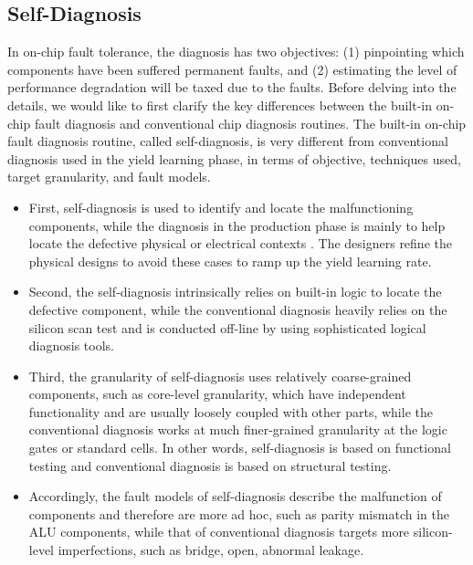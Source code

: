 \subsection{Self-Diagnosis}
In on-chip fault tolerance, the diagnosis has two objectives: (1) pinpointing which components have been suffered permanent faults, and (2) estimating the level of performance degradation will be taxed due to the faults. Before delving into the details, we would like to first clarify the key differences between the built-in on-chip fault diagnosis and conventional chip diagnosis routines. The built-in on-chip fault diagnosis routine, called self-diagnosis, is very different from conventional diagnosis used in the yield learning phase, in terms of objective, techniques used, target granularity, and fault models.

\begin{itemize}
\item First, self-diagnosis is used to identify and locate the malfunctioning components, while the diagnosis in the production phase is mainly to help locate the defective physical or electrical contexts \cite{aitken2012yield}. The designers refine the physical designs to avoid these cases to ramp up the yield learning rate.

\item Second, the self-diagnosis intrinsically relies on built-in logic to locate the defective component, while the conventional diagnosis heavily relies on the silicon scan test and is conducted off-line by using sophisticated logical diagnosis tools.

\item Third, the granularity of self-diagnosis uses relatively coarse-grained components, such as core-level granularity, which have independent functionality and are usually loosely coupled with other parts, while the conventional diagnosis works at much finer-grained granularity at the logic gates or standard cells. In other words, self-diagnosis is based on functional testing and conventional diagnosis is based on structural testing.

\item Accordingly, the fault models of self-diagnosis describe the malfunction of components and therefore are more ad hoc, such as parity mismatch in the ALU components, while that of conventional diagnosis targets more silicon-level imperfections, such as bridge, open, abnormal leakage.
\end{itemize}

